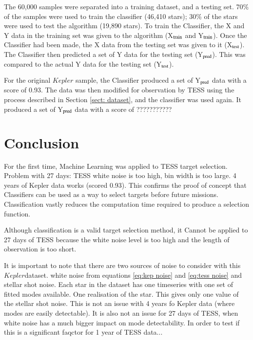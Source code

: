 \documentclass[a4paper,fleqn,usenatbib,useAMS]{mnras}
\newcommand{\kep}{\ensuremath{Kepler}\:}
\begin{document}
The 60,000 samples were separated into a training dataset, and a testing set. 70\% of the samples were used to train the classifier (46,410 stars); 30\% of the stars were used to test the algorithm (19,890 stars). To train the Classifier, the X and Y data in the training set was given to the algorithm (X$_{\rm train}$ and Y$_{\rm train}$). Once the Classifier had been made, the X data from the testing set was given to it (X$_{\rm test}$). The Classifier then predicted a set of Y data for the testing set (Y$_{\rm pred}$). This was compared to the actual Y data for the testing set (Y$_{\rm test}$).

For the original $Kepler$ sample, the Classifier produced a set of Y$_{\rm pred}$ data with a score of 0.93. The data was then modified for observation by TESS using the process described in Section \ref{sect: dataset}, and the classifier was used again. It produced a set of Y$_{\rm pred}$ data with a score of ???????????


\section{Conclusion}
\label{sect: conc}

For the first time, Machine Learning was applied to TESS target selection.
Problem with 27 days: TESS white noise is too high, bin width is too large.
4 years of Kepler data works (scored 0.93). This confirms the proof of concept that Classifiers can be used as a way to select targets before future missions. Classification vastly reduces the computation time required to produce a selection function.

Although classification is a valid target selection method, it Cannot be applied to 27 days of TESS because the white noise level is too high and the length of observation is too short.

It is important to note that there are two sources of noise to consider with this \kep dataset. white noise from equations \ref{eq:kep noise} and \ref{eq:tess noise} and stellar shot noise. Each star in the dataset has one timeseries with one set of fitted modes available. One realisation of the star. This gives only one value of the stellar shot noise. This is not an issue with 4 years fo Kepler data (where modes are easily detectable). It is also not an issue for 27 days of TESS, when white noise has a much bigger impact on mode detectability. In order to test if this is a significant faqctor for 1 year of TESS data...








\bsp
\label{lastpage}
\end{document}
